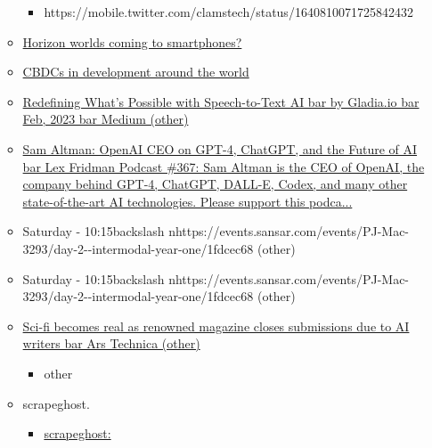 \begin{itemize}
\begin{itemize}
\begin{itemize}
    \item
      https://mobile.twitter.com/clamstech/status/1640810071725842432
    \end{itemize}
  \item
    \href{https://www.reddit.com/r/virtualreality/comments/u4ahwu/horizon_worlds_coming_to_smartphones_web_probably/}{Horizon
    worlds coming to smartphones?}
  \item
    \href{https://www.reddit.com/r/CryptoCurrency/comments/10wx51p/the_current_list_of_cbdcs_in_development_around/}{CBDCs
    in development around the world}
  \item
    \href{https://medium.com/@gladia.io/gladia-alpha-launch-redefining-what-s-possible-with-speech-to-text-ai-686dd4312a86}{Redefining
    What's Possible with Speech-to-Text AI bar{} by Gladia.io
    bar{} Feb, 2023 bar{} Medium (other)}
  \item
    \href{https://m.youtube.com/watch?v=L_Guz73e6fw\&feature=youtu.be}{Sam
    Altman: OpenAI CEO on GPT-4, ChatGPT, and the Future of AI
    bar{} Lex Fridman Podcast \#367: Sam Altman is the CEO of
    OpenAI, the company behind GPT-4, ChatGPT, DALL-E, Codex, and many
    other state-of-the-art AI technologies. Please support this
    podca...}
  \item
    Saturday -
    10:15backslash nhttps://events.sansar.com/events/PJ-Mac-3293/day-2-\/-intermodal-year-one/1fdcec68
    (other)
  \item
    Saturday -
    10:15backslash nhttps://events.sansar.com/events/PJ-Mac-3293/day-2-\/-intermodal-year-one/1fdcec68
    (other)
  \item
    \href{https://arstechnica.com/information-technology/2023/02/sci-fi-becomes-real-as-renowned-magazine-closes-submissions-due-to-ai-writers}{Sci-fi
    becomes real as renowned magazine closes submissions due to AI
    writers bar{} Ars Technica (other)}

    \begin{itemize}
     
    \item
      other
    \end{itemize}
  \item
    scrapeghost.

    \begin{itemize}
     
    \item
      \href{https://jamesturk.github.io/scrapeghost/}{scrapeghost:}

      \begin{itemize}
       

\end{itemize}
\end{itemize}
\end{itemize}
\end{itemize}
